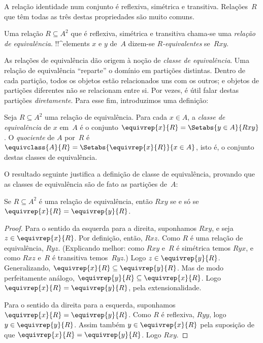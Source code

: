 \documentclass[../../../include/open-logic-section]{subfiles}
\begin{document}


A relação identidade num conjunto é reflexiva, simétrica e
transitiva. Relações~$R$ que têm todas as três destas propriedades são muito
comuns.

\begin{defn} 
Uma relação $R \subseteq A^2$ que é reflexiva, simétrica e
transitiva chama-se uma \emph{relação de equivalência}. !!^{element}s $x$
e $y$ de~$A$ dizem-se \emph{$R$-equivalentes} se~$Rxy$.
\end{defn}

As relações de equivalência dão origem à noção de \emph{classe de
equivalência}. Uma relação de equivalência ``reparte'' o domínio em
partições distintas. Dentro de cada partição, todos os objetos estão
relacionados uns com os outros; e objetos de partições diferentes não se
relacionam entre si. Por vezes, é útil falar destas
partições \emph{diretamente}. Para esse fim, introduzimos uma
definição:

\begin{defn}
Seja $R \subseteq A^2$ uma relação de equivalência. Para cada $x \in A$, a
\emph{classe de equivalência} de $x$ em~$A$ é o conjunto $\equivrep{x}{R}
= \Setabs{y \in A}{Rxy}$. O \emph{quociente} de $A$ por~$R$ é
$\equivclass{A}{R} = \Setabs{\equivrep{x}{R}}{x \in A}$, isto é, o conjunto
destas classes de equivalência. 
\end{defn}

O resultado seguinte justifica a definição de classe de equivalência,
provando que as classes de equivalência são de fato as partições de~$A$:

\begin{prop}
Se $R \subseteq A^2$ é uma relação de equivalência, então $Rxy$ se e só se
$\equivrep{x}{R} = \equivrep{y}{R}$.
\end{prop}

\begin{proof}
Para o sentido da esquerda para a direita, suponhamos $Rxy$, e seja $z \in
\equivrep{x}{R}$. Por definição, então, $Rxz$. Como $R$ é uma
relação de equivalência, $Ryz$. (Explicando melhor: como $Rxy$ e~$R$ é
simétrica temos $Ryx$, e como $Rxz$ e~$R$ é transitiva temos~$Ryz$.) Logo $z \in \equivrep{y}{R}$. Generalizando,
$\equivrep{x}{R} \subseteq \equivrep{y}{R}$. Mas de modo perfeitamente análogo,
$\equivrep{y}{R} \subseteq \equivrep{x}{R}$. Logo $\equivrep{x}{R} =
\equivrep{y}{R}$, pela extensionalidade.

Para o sentido da direita para a esquerda, suponhamos $\equivrep{x}{R} =
\equivrep{y}{R}$. Como $R$ é reflexiva, $Ryy$, logo $y \in
\equivrep{y}{R}$. Assim também $y \in \equivrep{x}{R}$ pela suposição
de que $\equivrep{x}{R} = \equivrep{y}{R}$. Logo $Rxy$.
\end{proof}
\end{document}
